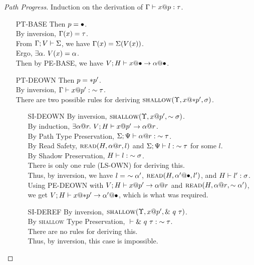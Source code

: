 \begin{proof}[Path Progress]
  Induction on the derivation of ${\Gamma} \vdash {{x}@{p}} : {\tau}$.
  \begin{itemize}
    \item[PT-BASE] 
      Then $p = \bullet$.\\
      By inversion, $\Gamma(x)=\tau$.\\
      From $\Gamma;V\vdash\Sigma$, we have $\Gamma(x)=\Sigma(V(x))$.\\
      Ergo, $\exists \alpha.~V(x)=\alpha$.\\
      Then by \textsc{PE-BASE}, we have ${V;H} \vdash {{x}@{\bullet}} \to {{\alpha}@{\bullet}}$.
    \item[PT-DEOWN] 
      Then $p = *{p'}$.\\
      By inversion, ${\Gamma} \vdash {{x}@{p'}} : {\sim{\tau}}$.\\
      There are two possible rules for deriving $\textsc{shallow}({\Upsilon},{{x}@{*{p'}}},{\sigma})$.
      \begin{itemize}
	\item[\textsc{SI-DEOWN}]
	  By inversion, $\textsc{shallow}({\Upsilon},{{x}@{p'}},{\sim{\sigma}})$.\\
	  By induction, $\exists {\alpha}@{r}.~{V;H} \vdash {{x}@{p'}} \to {{\alpha}@{r}}$.\\
	  By Path Type Preservation, ${\Sigma;\Psi} \vdash {{\alpha}@{r}} : {\sim{\tau}}$.\\
	  By Read Safety, $\textsc{read}({H},{{\alpha}@{r}},{l})$ 
	  and ${\Sigma;\Psi} \vdash {l} : {\sim{\tau}}$ for some $l$.\\
	  By Shadow Preservation, ${H} \vdash {l} : {\sim{\sigma}}$.\\
	  There is only one rule (\textsc{LS-OWN}) for deriving this.\\
	  Thus, by inversion, we have $l =\ \own{\ga'}$,
	  $\textsc{read}({H},{{\alpha'}@{\bullet}},{l'})$, and ${H} \vdash {l'} : {\sigma}$.\\
	  Using \textsc{PE-DEOWN} with
	  ${V;H} \vdash {{x}@{p'}} \to {{\alpha}@{r}}$ and
	  $\textsc{read}({H},{{\alpha}@{r}},{\sim{\alpha'}})$, \\ 
	  we get ${V;H} \vdash {{x}@{*{p'}}} \to {{\alpha'}@{\bullet}}$,
	  which is what was required.
	\item[\textsc{SI-DEREF}]
	  By inversion, $\textsc{shallow}({\Upsilon},{{x}@{p'}},{\&~{{q}~{\tau}}})$.\\
	  By \textsc{shallow} Type Preservation, ${} \vdash {\&~{{q}~{\tau}}} : {\sim{\tau}}$.\\
	  There are no rules for deriving this.\\
	  Thus, by inversion, this case is impossible.
      \end{itemize}


\end{itemize}
\end{proof}
